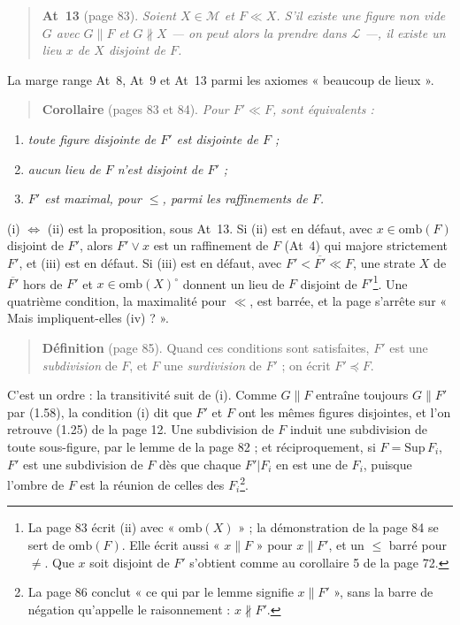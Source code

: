 \documentclass[11pt,a4paper]{article}
\begin{document}
\begin{quote}
\textbf{At~13} (page 83). \emph{Soient $X \in \mathcal{M}$ et $F \ll X$. S'il existe
une figure non vide $G$ avec $G \parallel F$ et $G \nparallel X$ --- on peut alors
la prendre dans $\mathcal{L}$ ---, il existe un lieu $x$ de $X$ disjoint de $F$.}
\end{quote}

La marge range At~8, At~9 et At~13 parmi les axiomes « beaucoup de lieux ».

\begin{quote}
\textbf{Corollaire} (pages 83 et 84). \emph{Pour $F' \ll F$, sont équivalents :}
\end{quote}
\begin{enumerate}
\item[(i)] \emph{toute figure disjointe de $F'$ est disjointe de $F$ ;}
\item[(ii)] \emph{aucun lieu de $F$ n'est disjoint de $F'$ ;}
\item[(iii)] \emph{$F'$ est maximal, pour $\leq$, parmi les raffinements de $F$.}
\end{enumerate}

(i) $\Leftrightarrow$ (ii) est la proposition, sous At~13. Si (ii) est en défaut,
avec $x \in \mathrm{omb}(F)$ disjoint de $F'$, alors $F' \vee x$ est un
raffinement de $F$ (At~4) qui majore strictement $F'$, et (iii) est en défaut.
Si (iii) est en défaut, avec $F' < \overline{F'} \ll F$, une strate $X$ de
$\overline{F'}$ hors de $F'$ et $x \in \mathrm{omb}(X)^{\circ}$ donnent un lieu de
$F$ disjoint de $F'$\footnote{La page 83 écrit (ii) avec « $\mathrm{omb}(X)$ » ;
la démonstration de la page 84 se sert de $\mathrm{omb}(F)$. Elle écrit aussi
« $x \parallel F$ » pour $x \parallel F'$, et un $\leq$ barré pour $\neq$. Que $x$
soit disjoint de $F'$ s'obtient comme au corollaire 5 de la page 72.}. Une
quatrième condition, la maximalité pour $\ll$, est barrée, et la page s'arrête
sur « Mais impliquent-elles (iv) ? ».

\begin{quote}
\textbf{Définition} (page 85). Quand ces conditions sont satisfaites, $F'$ est une
\emph{subdivision} de $F$, et $F$ une \emph{surdivision} de $F'$ ; on écrit $F'
\preccurlyeq F$.
\end{quote}

C'est un ordre : la transitivité suit de (i). Comme $G \parallel F$ entraîne
toujours $G \parallel F'$ par (1.58), la condition (i) dit que $F'$ et $F$ ont
les mêmes figures disjointes, et l'on retrouve (1.25) de la page 12. Une
subdivision de $F$ induit une subdivision de toute sous-figure, par le lemme de
la page 82 ; et réciproquement, si $F = \mathrm{Sup}\,F_{i}$, $F'$ est une
subdivision de $F$ dès que chaque $F'|F_{i}$ en est une de $F_{i}$, puisque
l'ombre de $F$ est la réunion de celles des $F_{i}$\footnote{La page 86 conclut
« ce qui par le lemme signifie $x \parallel F'$ », sans la barre de négation
qu'appelle le raisonnement : $x \nparallel F'$.}.
\end{document}
